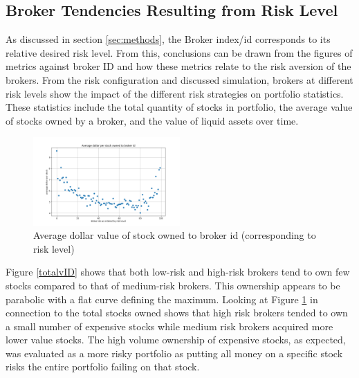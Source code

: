 \documentclass[letterpaper, 11 pt, proceedings]{IEEEtran}
\begin{document}
	
	\subsection{Broker Tendencies Resulting from Risk Level}\label{subsec:tendencies}	
	As discussed in section \ref{sec:methods}, the Broker index/id corresponds to its relative desired risk level. From this, conclusions can be drawn from the figures of metrics against broker ID and how these metrics relate to the risk aversion of the brokers. From the risk configuration and discussed simulation, brokers at different risk levels show the impact of the different risk strategies on portfolio statistics. These statistics include the total quantity of stocks in portfolio, the average value of stocks owned by a broker, and the value of liquid assets over time.
	

	
	\begin{figure}[h]
		\centering
		\includegraphics[width=0.5\textwidth]{averageDollarPerStockToBrokerIds.png}
		\caption{Average dollar value of stock owned to broker id (corresponding to risk level)}
		\label{dollarValue}
	\end{figure}
	\FloatBarrier
	
	Figure \ref{totalvID} shows that both low-risk and high-risk brokers tend to own few stocks compared to that of medium-risk brokers. This ownership appears to be parabolic with a flat curve defining the maximum. Looking at Figure \ref{dollarValue} in connection to the total stocks owned shows that high risk brokers tended to own a small number of expensive stocks while medium risk brokers acquired more lower value stocks. The high volume ownership of expensive stocks, as expected, was evaluated as a more risky portfolio as putting all money on a specific stock risks the entire portfolio failing on that stock.
\end{document}
